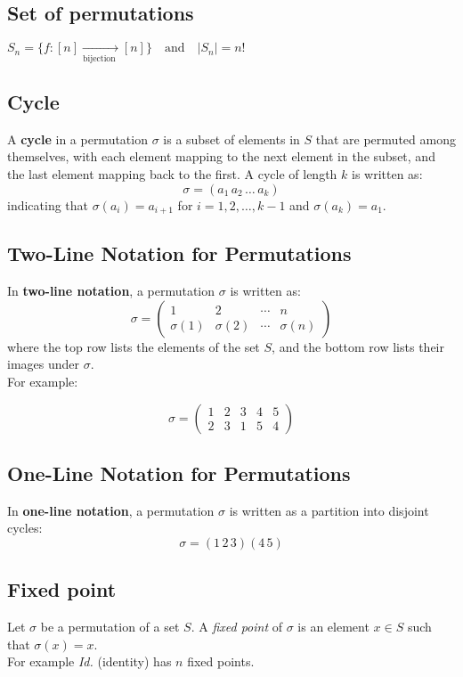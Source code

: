 \documentclass{article}
\begin{document}
\subsection{Set of permutations}

\(S_n = \{f: [n]  \xrightarrow[\text{bijection }]{} [n]\} \quad \text{and} \quad |S_n| = n!\)

\subsection{Cycle}
A \textbf{cycle} in a permutation \(\sigma\) is a subset of elements in \(S\) that are permuted among themselves, with each element mapping to the next element in the subset, and the last element mapping back to the first. A cycle of length \(k\) is written as:
\[
\sigma = (a_1 \, a_2 \, \ldots \, a_k)
\]
indicating that \(\sigma(a_i) = a_{i+1}\) for \(i = 1, 2, \ldots, k-1\) and \(\sigma(a_k) = a_1\).

\subsection{Two-Line Notation for Permutations}
In \textbf{two-line notation}, a permutation \(\sigma\) is written as:
\[
\sigma = \begin{pmatrix}
1 & 2 & \cdots & n \\
\sigma(1) & \sigma(2) & \cdots & \sigma(n)
\end{pmatrix}
\]
where the top row lists the elements of the set \(S\), and the bottom row lists their images under \(\sigma\).\\
For example:

\[
\sigma = \begin{pmatrix}
1 & 2 & 3 & 4 & 5 \\
2 & 3 & 1 & 5 & 4
\end{pmatrix}
\]

\subsection{One-Line Notation for Permutations}
In \textbf{one-line notation}, a permutation \(\sigma\) is written as a partition into disjoint cycles:
\[
\sigma = (1\, 2\, 3)(4\, 5)
\]

\subsection{Fixed point}

Let \(\sigma\) be a permutation of a set \(S\). A \textit{fixed point} of \(\sigma\) is an element \(x \in S\) such that \(\sigma(x) = x\).\\
For example \textit{Id.} (identity) has $n$ fixed points.
\end{document}
